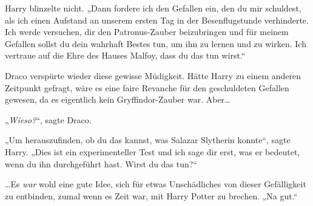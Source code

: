 Harry blinzelte nicht. „Dann fordere ich den Gefallen ein, den du mir schuldest, als ich einen Aufstand an unserem ersten Tag in der Besenflugstunde verhinderte. Ich werde versuchen, dir den Patronus-Zauber beizubringen und für meinem Gefallen sollst du dein wahrhaft Bestes tun, um ihn zu lernen und zu wirken. Ich vertraue auf die Ehre des Hauses Malfoy, dass du das tun wirst.“

Draco verspürte wieder diese gewisse Müdigkeit. Hätte Harry zu einem anderen Zeitpunkt gefragt, wäre es eine faire Revanche für den geschuldeten Gefallen gewesen, da es eigentlich kein Gryffindor-Zauber war. Aber…

„\emph{Wieso?}“, sagte Draco.

„Um herauszufinden, ob du das kannst, was Salazar Slytherin konnte“, sagte Harry. „Dies ist ein experimenteller Test und ich sage dir erst, was er bedeutet, wenn du ihn durchgeführt hast. Wirst du das tun?“

…Es \emph{war} wohl eine gute Idee, sich für etwas Unschädliches von dieser Gefälligkeit zu entbinden, zumal wenn es Zeit war, mit Harry Potter zu brechen. „Na gut.“

